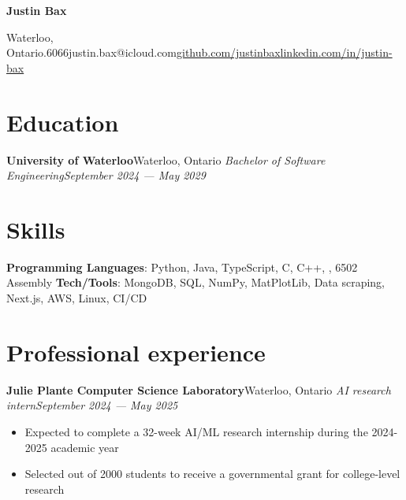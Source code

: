 \documentclass{article}
\newcommand{\cdelim}{\;\textbar\;}
\newcommand{\newrole}[4]{
    {\normalfont\textbf{#1}\hfill#3}
    \newline
    \textit{#2}\hfill\textit{#4}
}
\newenvironment{bulletpoints}{\begin{itemize}\setlength\itemsep{-0.3em}}{\end{itemize}}
\begin{document}
\begin{center}
    {\Huge\bfseries Justin Bax}\\\vspace*{2pt}

    Waterloo, Ontario\cdelim 438.763.6066\cdelim justin.bax@icloud.com\cdelim\href{https://github.com/justinbax}{github.com/justinbax}\cdelim\href{https://linkedin.com/in/justin-bax}{linkedin.com/in/justin-bax}\\
\end{center}

\section*{Education}

\newrole{University of Waterloo}{Bachelor of Software Engineering}{Waterloo, Ontario}{September 2024 --- May 2029}


\section*{Skills}

{\bfseries Programming Languages}: Python, Java, TypeScript, C, C++, , 6502 Assembly
\newline
{\bfseries Tech/Tools}: MongoDB, SQL, NumPy, MatPlotLib, Data scraping, Next.js, AWS, Linux, CI/CD


\section*{Professional experience}

\newrole{Julie Plante Computer Science Laboratory}{AI research intern}{Waterloo, Ontario}{September 2024 --- May 2025}
\begin{bulletpoints}
    \item Expected to complete a 32-week AI/ML research internship during the 2024-2025 academic year
    \item Selected out of 2000 students to receive a governmental grant for college-level research
\end{bulletpoints}
\end{document}
